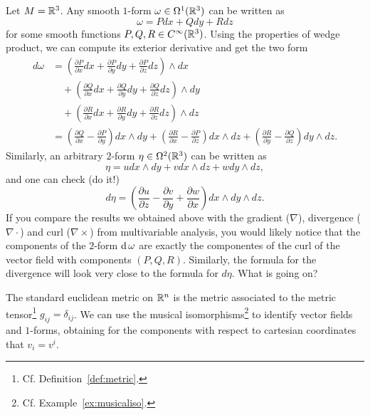 \begin{example}
  Let $M=\mathbb{R}^3$. Any smooth $1$-form $\omega\in\Omega^1(\mathbb{R}^3)$ can be written as
  \begin{equation}
    \omega = P dx + Q dy + R dz
  \end{equation}
  for some smooth functions $P,Q,R\in C^\infty(\mathbb{R}^3)$.
  Using the properties of wedge product, we can compute its exterior derivative and get the two form
  \begin{align}
    d\omega &= \left(\frac{\partial P}{\partial x} dx + \frac{\partial P}{\partial y} dy + \frac{\partial P}{\partial z} dz \right) \wedge dx \\
      &\quad+\left(\frac{\partial Q}{\partial x} dx + \frac{\partial Q}{\partial y} dy + \frac{\partial Q}{\partial z} dz \right) \wedge dy \\
      &\quad+\left(\frac{\partial R}{\partial x} dx + \frac{\partial R}{\partial y} dy + \frac{\partial R}{\partial z} dz \right) \wedge dz \\
    &= \left(\frac{\partial Q}{\partial x} - \frac{\partial P}{\partial y}\right) dx \wedge dy + 
    \left(\frac{\partial R}{\partial x} - \frac{\partial P}{\partial z}\right) dx \wedge dz + \left(\frac{\partial R}{\partial y} - \frac{\partial Q}{\partial z}\right) dy \wedge dz.
  \end{align}
  Similarly, an arbitrary $2$-form $\eta\in\Omega^2(\mathbb{R}^3)$ can be written as
  \begin{equation}
    \eta = u dx\wedge dy + v dx\wedge dz + w dy\wedge dz,
  \end{equation}
  and one can check (do it!)
  \begin{equation}
    d\eta = \left(\frac{\partial u}{\partial z}-\frac{\partial v}{\partial y} + \frac{\partial w}{\partial x}\right) dx\wedge dy \wedge dz.
  \end{equation}
  If you compare the results we obtained above with the gradient ($\nabla$), divergence ($\nabla\cdot$) and curl ($\nabla\times$) from multivariable analysis, you would likely notice that the components of the $2$-form $\operatorname{d}\omega$ are exactly the componentes of the curl of the vector field with components $(P, Q, R)$.
  Similarly, the formula for the divergence will look very close to the formula for $d\eta$. 
  What is going on?
  
  The standard euclidean metric on $\mathbb{R}^n$ is the metric associated to the metric tensor\footnote{Cf. Definition~\ref{def:metric}.} $g_{ij} = \delta_{ij}$.
  We can use the musical isomorphisms\footnote{Cf. Example~\ref{ex:musicaliso}.} to identify vector fields and $1$-forms, obtaining for the components with respect to cartesian coordinates that $v_i = v^i$.
  

\end{example}
